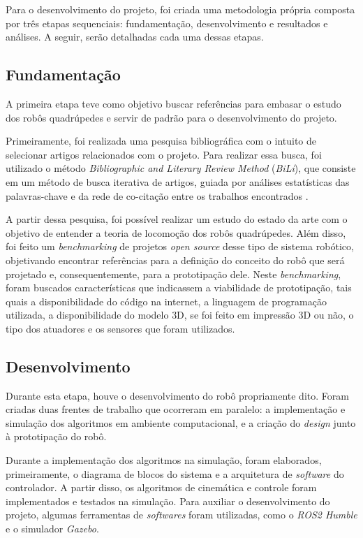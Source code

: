 \documentclass[../main.tex]{subfiles}
\begin{document}
  Para o desenvolvimento do projeto, foi criada uma metodologia própria composta por três etapas sequenciais: fundamentação, desenvolvimento e resultados e análises. A seguir, serão detalhadas cada uma dessas etapas.

  \subsection{Fundamentação}
  A primeira etapa teve como objetivo buscar referências para embasar o estudo dos robôs quadrúpedes e servir de padrão para o desenvolvimento do projeto.

  Primeiramente, foi realizada uma pesquisa bibliográfica com o intuito de selecionar artigos relacionados com o projeto. Para realizar essa busca, foi utilizado o método \textit{Bibliographic and Literary Review Method} (\textit{BiLi}), que consiste em um método de busca iterativa de artigos, guiada por análises estatísticas das palavras-chave e da rede de co-citação entre os trabalhos encontrados \cite{bili}.

  A partir dessa pesquisa, foi possível realizar um estudo do estado da arte com o objetivo de entender a teoria de locomoção dos robôs quadrúpedes. Além disso, foi feito um \textit{benchmarking} de projetos \textit{open source} desse tipo de sistema robótico, objetivando encontrar referências para a definição do conceito do robô que será projetado e, consequentemente, para a prototipação dele. Neste \textit{benchmarking}, foram buscados características que indicassem a viabilidade de prototipação, tais quais a disponibilidade do código na internet, a linguagem de programação utilizada, a disponibilidade do modelo 3D, se foi feito em impressão 3D ou não, o tipo dos atuadores e os sensores que foram utilizados.

  \subsection{Desenvolvimento}
  Durante esta etapa, houve o desenvolvimento do robô propriamente dito. Foram criadas duas frentes de trabalho que ocorreram em paralelo: a implementação e simulação dos algoritmos em ambiente computacional, e a criação do \textit{design} junto à prototipação do robô.

  Durante a implementação dos algoritmos na simulação, foram elaborados, primeiramente, o diagrama de blocos do sistema e a arquitetura de \textit{software} do controlador. A partir disso, os algoritmos de cinemática e controle foram implementados e testados na simulação. Para auxiliar o desenvolvimento do projeto, algumas ferramentas de \textit{softwares} foram utilizadas, como o \textit{ROS2 Humble} e o simulador \textit{Gazebo}.
\end{document}
